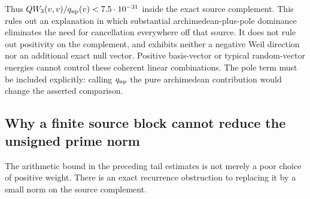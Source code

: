 \documentclass[11pt]{article}
\theoremstyle{remark}
\begin{document}
Thus $QW_3(v,v)/q_{\rm np}(v)<7.5\cdot10^{-31}$ inside the exact
source complement. This rules out an explanation in which substantial
archimedean-plus-pole dominance eliminates the need for cancellation
everywhere off that source. It does not rule out positivity on the
complement, and exhibits neither a negative Weil direction nor an
additional exact null vector. Positive basis-vector or typical
random-vector energies cannot control these coherent linear combinations.
The pole term must be included explicitly: calling $q_{\rm np}$ the
pure archimedean contribution would change the asserted comparison.


\subsection*{Why a finite source block cannot reduce the unsigned prime norm}

The arithmetic bound in the preceding tail estimates is not merely a
poor choice of positive weight.  There is an exact recurrence obstruction
to replacing it by a small norm on the source complement.
\end{document}
